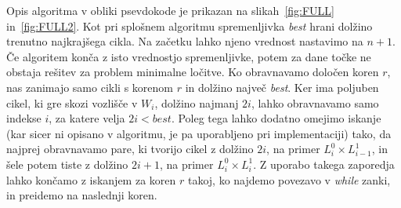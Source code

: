 \documentclass[a4paper, 12pt]{book}
\newcommand{\GG}{\ensuremath{G_{\le 1}}}
\def\best{\mathit{best}}
\def\dist{\mathit{dist}}
\begin{document}


Opis algoritma v obliki psevdokode je prikazan na slikah~\ref{fig:FULL} in~\ref{fig:FULL2}. Kot pri splošnem algoritmu spremenljivka \textit{best} hrani dolžino trenutno najkrajšega cikla. Na začetku lahko njeno vrednost nastavimo na $n+1$. Če algoritem konča z isto vrednostjo spremenljivke, potem za dane točke ne obstaja rešitev za problem minimalne ločitve. Ko obravnavamo določen koren $r$, nas zanimajo samo cikli s korenom $r$ in dolžino največ \textit{best}. Ker ima poljuben cikel, ki gre skozi vozlišče v $W_i$, dolžino najmanj $2i$, lahko obravnavamo samo indekse $i$, za katere velja $2i < best$. Poleg tega lahko dodatno omejimo iskanje (kar sicer ni opisano v algoritmu, je pa uporabljeno pri implementaciji) tako, da najprej obravnavamo pare, ki tvorijo cikel z dolžino $2i$, na primer $L^0_i\times L^1_{i-1}$, in šele potem tiste z dolžino $2i+1$, na primer $L^0_i\times L^1_i$. Z uporabo takega zaporedja lahko končamo z iskanjem za koren $r$ takoj, ko najdemo povezavo v \textit{while} zanki, in preidemo na naslednji koren.
\end{document}
